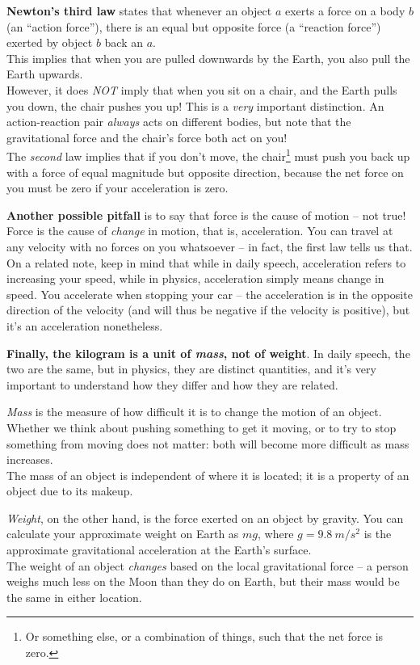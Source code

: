 \documentclass[12pt,a4paper]{report}
\begin{document}
\textbf{Newton's third law} states that whenever an object $a$ exerts a force on a body $b$ (an ``action force''), there is an equal but opposite force (a ``reaction force'') exerted by object $b$ back an $a$.\\
This implies that when you are pulled downwards by the Earth, you also pull the Earth upwards.\\
However, it does \emph{NOT} imply that when you sit on a chair, and the Earth pulls you down, the chair pushes you up! This is a \emph{very} important distinction. An action-reaction pair \emph{always} acts on different bodies, but note that the gravitational force and the chair's force both act on you!\\
The \emph{second} law implies that if you don't move, the chair\footnote{Or something else, or a combination of things, such that the net force is zero.} must push you back up with a force of equal magnitude but opposite direction, because the net force on you must be zero if your acceleration is zero.

\textbf{Another possible pitfall} is to say that force is the cause of motion -- not true! Force is the cause of \emph{change} in motion, that is, acceleration. You can travel at any velocity with no forces on you whatsoever -- in fact, the first law tells us that.\\
On a related note, keep in mind that while in daily speech, acceleration refers to increasing your speed, while in physics, acceleration simply means change in speed. You accelerate when stopping your car -- the acceleration is in the opposite direction of the velocity (and will thus be negative if the velocity is positive), but it's an acceleration nonetheless.

\textbf{Finally, the kilogram is a unit of \emph{mass}, not of weight}. In daily speech, the two are the same, but in physics, they are distinct quantities, and it's very important to understand how they differ and how they are related.

\emph{Mass} is the measure of how difficult it is to change the motion of an object. Whether we think about pushing something to get it moving, or to try to stop something from moving does not matter: both will become more difficult as mass increases.\\
The mass of an object is independent of where it is located; it is a property of an object due to its makeup.

\emph{Weight}, on the other hand, is the force exerted on an object by gravity. You can calculate your approximate weight on Earth as $m g$, where $g = \SI{9.8}{m/s^2}$ is the approximate gravitational acceleration at the Earth's surface.\\
The weight of an object \emph{changes} based on the local gravitational force -- a person weighs much less on the Moon than they do on Earth, but their mass would be the same in either location.
\end{document}
